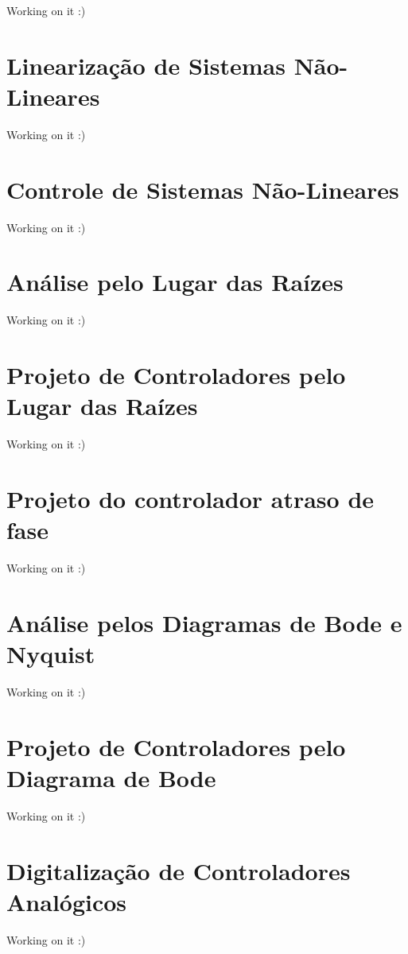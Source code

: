 \documentclass[
]{book}
\begin{document}
Working on it :)

\hypertarget{linearizauxe7uxe3o-de-sistemas-nuxe3o-lineares}{%
\chapter{Linearização de Sistemas Não-Lineares}\label{linearizauxe7uxe3o-de-sistemas-nuxe3o-lineares}}

Working on it :)

\hypertarget{controle-de-sistemas-nuxe3o-lineares}{%
\chapter{Controle de Sistemas Não-Lineares}\label{controle-de-sistemas-nuxe3o-lineares}}

Working on it :)

\hypertarget{anuxe1lise-pelo-lugar-das-rauxedzes}{%
\chapter{Análise pelo Lugar das Raízes}\label{anuxe1lise-pelo-lugar-das-rauxedzes}}

Working on it :)

\hypertarget{projeto-de-controladores-pelo-lugar-das-rauxedzes}{%
\chapter{Projeto de Controladores pelo Lugar das Raízes}\label{projeto-de-controladores-pelo-lugar-das-rauxedzes}}

Working on it :)

\hypertarget{projeto-do-controlador-atraso-de-fase}{%
\chapter{Projeto do controlador atraso de fase}\label{projeto-do-controlador-atraso-de-fase}}

Working on it :)

\hypertarget{anuxe1lise-pelos-diagramas-de-bode-e-nyquist}{%
\chapter{Análise pelos Diagramas de Bode e Nyquist}\label{anuxe1lise-pelos-diagramas-de-bode-e-nyquist}}

Working on it :)

\hypertarget{projeto-de-controladores-pelo-diagrama-de-bode}{%
\chapter{Projeto de Controladores pelo Diagrama de Bode}\label{projeto-de-controladores-pelo-diagrama-de-bode}}

Working on it :)

\hypertarget{digitalizauxe7uxe3o-de-controladores-analuxf3gicos}{%
\chapter{Digitalização de Controladores Analógicos}\label{digitalizauxe7uxe3o-de-controladores-analuxf3gicos}}

Working on it :)

  
\end{document}

